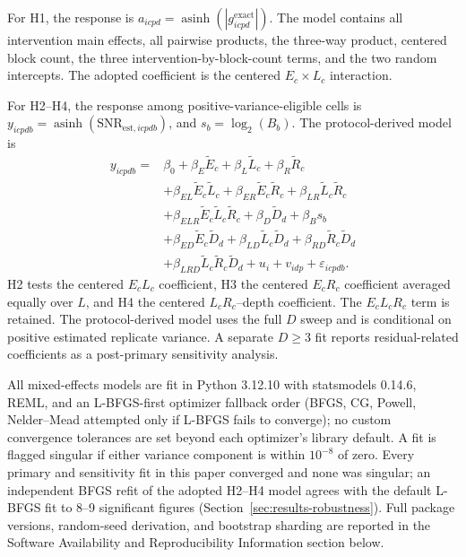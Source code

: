 \documentclass[pdflatex,sn-basic,Numbered]{sn-jnl}
\begin{document}
For H1, the response is $a_{icpd}=\operatorname{asinh}(|g^{\mathrm{exact}}_{icpd}|)$. The model contains all intervention main effects, all pairwise products, the three-way product, centered block count, the three intervention-by-block-count terms, and the two random intercepts. The adopted coefficient is the centered $E_c\times L_c$ interaction.

For H2--H4, the response among positive-variance-eligible cells is $y_{icpdb}=\operatorname{asinh}(\mathrm{SNR}_{\mathrm{est},icpdb})$, and $s_b=\log_2(B_b)$. The protocol-derived model is
\begin{align*}
y_{icpdb}={}&\beta_0
+\beta_E\widetilde E_c
+\beta_L\widetilde L_c
+\beta_R\widetilde R_c\\
&+\beta_{EL}\widetilde E_c\widetilde L_c
+\beta_{ER}\widetilde E_c\widetilde R_c
+\beta_{LR}\widetilde L_c\widetilde R_c\\
&+\beta_{ELR}\widetilde E_c\widetilde L_c\widetilde R_c
+\beta_D\widetilde D_d+\beta_B s_b\\
&+\beta_{ED}\widetilde E_c\widetilde D_d
+\beta_{LD}\widetilde L_c\widetilde D_d
+\beta_{RD}\widetilde R_c\widetilde D_d\\
&+\beta_{LRD}\widetilde L_c\widetilde R_c\widetilde D_d
+u_i+v_{idp}+\varepsilon_{icpdb}.
\end{align*}
H2 tests the centered $E_cL_c$ coefficient, H3 the centered $E_cR_c$ coefficient averaged equally over $L$, and H4 the centered $L_cR_c$--depth coefficient. The $E_cL_cR_c$ term is retained. The protocol-derived model uses the full $D$ sweep and is conditional on positive estimated replicate variance. A separate $D\ge3$ fit reports residual-related coefficients as a post-primary sensitivity analysis.

All mixed-effects models are fit in Python 3.12.10 with statsmodels 0.14.6, REML, and an L-BFGS-first optimizer fallback order (BFGS, CG, Powell, Nelder--Mead attempted only if L-BFGS fails to converge); no custom convergence tolerances are set beyond each optimizer's library default. A fit is flagged singular if either variance component is within $10^{-8}$ of zero. Every primary and sensitivity fit in this paper converged and none was singular; an independent BFGS refit of the adopted H2--H4 model agrees with the default L-BFGS fit to 8--9 significant figures (Section~\ref{sec:results-robustness}). Full package versions, random-seed derivation, and bootstrap sharding are reported in the Software Availability and Reproducibility Information section below.
\end{document}
